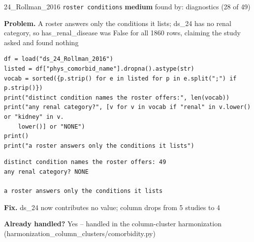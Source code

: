 \documentclass[9pt, t, handout]{beamer}
\newcommand{\ans}[1]{\textcolor{structure.fg}{#1}}
\begin{document}
\begin{frame}[fragile]{24\_Rollman\_2016 \quad \texttt{roster conditions}}
  {\scriptsize\textcolor{blue!55!black}{\textbf{medium}} \quad
   found by: diagnostics \quad (28 of 49)}
  \vspace{3pt}

  {\footnotesize \textbf{Problem.} A roster answers only the conditions it lists; ds\_24 has no renal category, so has\_renal\_disease was False for all 1860 rows, claiming the study asked and found nothing}
  \vspace{4pt}

  \begin{Verbatim}[fontsize=\tiny, frame=single, framesep=2pt, label=\tiny reproduce]
df = load("ds_24_Rollman_2016")
listed = df["phys_comorbid_name"].dropna().astype(str)
vocab = sorted({p.strip() for e in listed for p in e.split(";") if p.strip()})
print("distinct condition names the roster offers:", len(vocab))
print("any renal category?", [v for v in vocab if "renal" in v.lower() or "kidney" in v.
    lower()] or "NONE")
print()
print("a roster answers only the conditions it lists")
  \end{Verbatim}
  \begin{Verbatim}[fontsize=\tiny, frame=single, framesep=2pt, label=\tiny output]
distinct condition names the roster offers: 49
any renal category? NONE

a roster answers only the conditions it lists
  \end{Verbatim}
  \vspace{2pt}

  {\footnotesize \textbf{Fix.} ds\_24 now contributes no value; column drops from 5 studies to 4}
  \vspace{2pt}

  {\footnotesize \textbf{Already handled?} \ans{Yes} -- handled in the column-cluster harmonization
   (harmonization\_column\_clusters/comorbidity.py)}
\end{frame}
\end{document}
